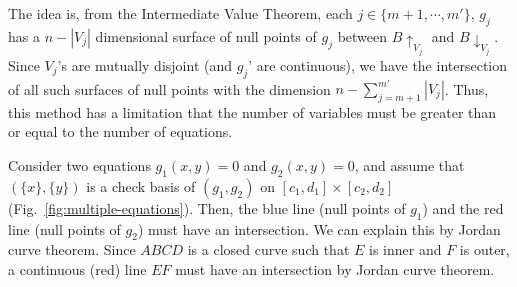 \documentclass[runningheads,a4paper,oribibl]{llncs}
\begin{document}
The idea is, from the Intermediate Value Theorem,
each $j \in \{m+1, \cdots, m'\}$, $g_j$ has a $n - |V_{j}|$ dimensional surface of null points of $g_j$
between $B\uparrow_{V_j}$ and $B\downarrow_{V_j}$. 
Since $V_j$'s are mutually disjoint (and $g_j$' are continuous),
we have the intersection of all such surfaces of null points with
the dimension $n - \sum_{j=m+1}^{m'} |V_j|$.
Thus, this method has a limitation that 
the number of variables must be greater than or equal to the number of equations.

\begin{example}
  Consider two equations $g_1(x, y)=0$ and $g_2(x, y) = 0$, and assume that $(\{x\}, \{y\})$
  is a check basis of $(g_1, g_2)$ on $[c_1,d_1] \times [c_2,d_2]$ (Fig.~\ref{fig:multiple-equations}).
  Then, the blue line (null points of $g_1$) and the red line (null points of $g_2$) must have
  an intersection. We can explain this by Jordan curve theorem. 
  Since $ABCD$ is a closed curve such that $E$ is inner and $F$ is outer,
  a continuous (red) line $EF$ must have an intersection by Jordan curve theorem. 
\end{example}

\end{document}
